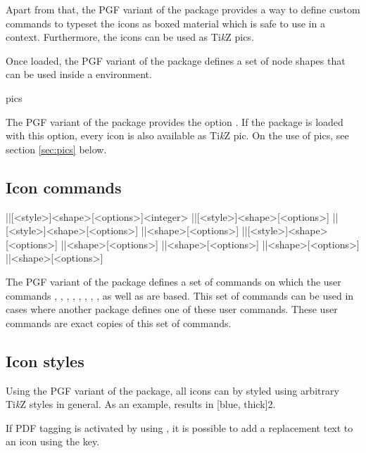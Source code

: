 \documentclass[a4paper]{article}
\begin{document}
Apart from that, the PGF variant of the package provides a way to define custom commands to typeset the icons as boxed material which is safe to use in a  context. Furthermore, the icons can be used as Ti\emph{k}Z pics.

Once loaded, the PGF variant of the package defines a set of node shapes that can be used inside a  environment.

\begin{macrodef}pics\end{macrodef}
The PGF variant of the package provides the option . If the package is loaded with this option, every icon is also available as Ti\emph{k}Z pic. On the use of pics, see section \ref{sec:pics} below.

\subsection{Icon commands}

\begin{macrodef}
|\rpgiconsdie|[<style>]{<shape>}[<options>]{<integer>}
|\rpgiconsability|[<style>]{<shape>}[<options>]
|\rpgiconssaving|[<style>]{<shape>}[<options>]
|\rpgiconsspell|{<shape>}[<options>]
|\rpgiconsspellschool|[<style>]{<shape>}[<options>]
|\rpgiconsdamage|{<shape>}[<options>]
|\rpgiconsattack|{<shape>}[<options>]
|\rpgiconscondition|{<shape>}[<options>]
|\rpgiconscurrency|{<shape>}[<options>]
\end{macrodef}
The PGF variant of the package defines a set of commands on which the user commands \macro{\die}, \macro{\ability}, \macro{\saving}, \macro{\spell}, \macro{\spellschool}, \macro{\damage}, \macro{\attack}, \macro{\condition}, \macro{\alignment} as well as \macro{\currency} are based. This set of commands can be used in cases where another package defines one of these user commands. These user commands are exact copies of this set of commands.

\subsection{Icon styles}

Using the PGF variant of the package, all icons can by styled using arbitrary Ti\emph{k}Z styles in general. As an example,  results in [blue, thick]{2}.

If PDF tagging is activated by using , it is possible to add a replacement text to an icon using the  key.
\end{document}
